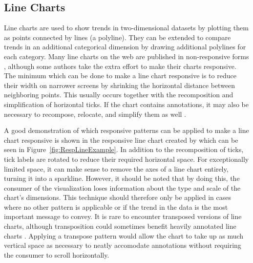 \subsection{Line Charts}
\label{sec:LineChartExamples}

Line charts are used to show trends in two-dimensional
datasets by plotting them as points connected by lines (a polyline).
They can be extended to compare trends in an additional categorical
dimension by drawing additional polylines for each category. Many line
charts on the web are published in non-responsive forms
\parencite{HLine,HLine2}, although some authors take the extra effort
to make their charts responsive. The minimum which can be done to make
a line chart responsive is to reduce their width
\parencite{RespRadialScatterHLine} on narrower screens by shrinking
the horizontal distance between neighboring points. This usually
occurs together with the recomposition and simplification of
horizontal ticks. If the chart contains annotations, it may also be
necessary to recompose, relocate, and simplify them as well
\parencite{RespHLines,RespHLine,RespHBarHLine,RespHLineHStackedBar}.

A good demonstration of which responsive patterns can be applied to
make a line chart responsive is shown in the responsive line chart
created by \textcite{RespVis} which can be seen in
Figure~\ref{fig:RespLineExample}. In addition to the recomposition of
ticks, tick labels are rotated to reduce their required horizontal
space. For exceptionally limited space, it can make sense to remove
the axes of a line chart entirely, turning it into a sparkline.
However, it should be noted that by doing this, the consumer of the
visualization loses information about the type and scale of the
chart's dimensions. This technique should therefore only be applied in
cases where no other pattern is applicable or if the trend in the data
is the most important message to convey. It is rare to encounter
transposed versions of line charts, although transposition could
sometimes benefit heavily annotated line charts \parencite{VLine}.
Applying a transpose pattern would allow the chart to take up as much
vertical space as necessary to neatly accomodate annotations without
requiring the consumer to scroll horizontally.



